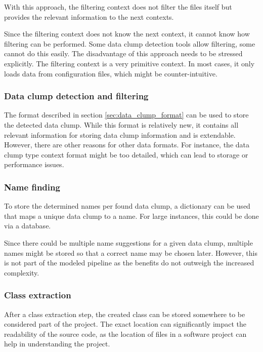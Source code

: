 With this approach, the filtering context does not filter the files itself but provides the relevant information to the next contexts. 

Since the filtering context does not know the next context, it cannot know how filtering can be performed. Some data clump detection tools allow filtering, some cannot do this easily. The disadvantage of this approach needs to be stressed explicitly. The filtering context is a very primitive context. In most cases, it only loads data from configuration files, which might be counter-intuitive. 

\begin{comment}
\subsubsection{Extraction of AST}
\end{comment}
\subsubsection{Data clump detection and filtering}

The format described in section \ref{sec:data_clump_format} can be used to store the detected data clump. While this format is relatively new, it contains all relevant information for storing data clump information and is extendable. However, there are other reasons for other data formats. For instance,  the data clump type context format might be too detailed, which can lead to storage or performance issues. 

\subsubsection{Name finding}
To store the determined names per found data clump, a dictionary can be used that maps a unique data clump to a name. For large instances, this could be done via a database. 

Since there could be multiple name suggestions for a given data clump, multiple names might be stored so that a correct name may be chosen later. However, this is not part of the modeled pipeline as the benefits do not outweigh the increased complexity.

\subsubsection{Class extraction}

After a class extraction step, the created class can be stored somewhere to be considered part of the project. The exact location can significantly impact the readability of the source code, as the location of files in a software project can help in understanding the project. 

